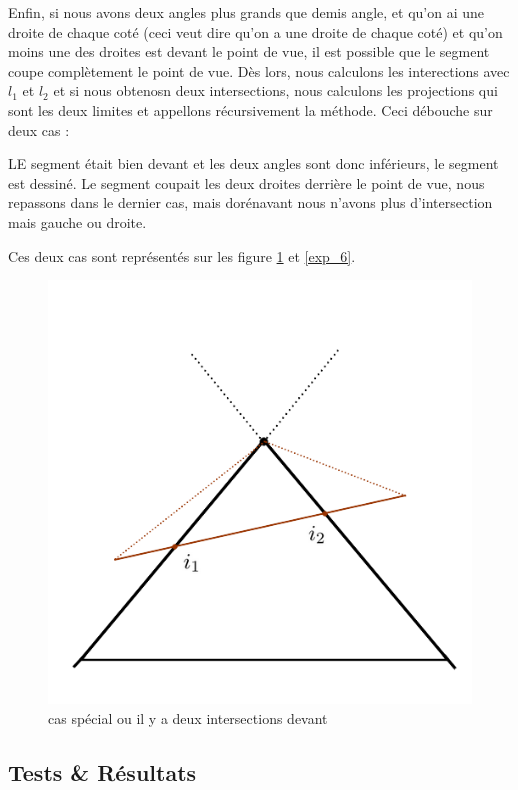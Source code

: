 \documentclass[11pt,a4paper]{article}
\begin{document}
Enfin, si nous avons deux angles plus grands que demis angle, et qu'on ai une droite de chaque coté (ceci veut dire qu'on a une droite de chaque coté) et qu'on moins une des droites est devant le point de vue, il est possible que le segment coupe complètement le point de vue. Dès lors, nous calculons les interections avec $l_1$ et $l_2$ et si nous obtenosn deux intersections, nous calculons les projections qui sont les deux limites et appellons récursivement la méthode. Ceci débouche sur deux cas :

LE segment était bien devant et les deux angles sont donc inférieurs, le segment est dessiné.
Le segment coupait les deux droites derrière le point de vue, nous repassons dans le dernier cas, mais dorénavant nous n'avons plus d'intersection mais gauche ou droite.

Ces deux cas sont représentés sur les figure \ref{exp_5} et \ref{exp_6}.
\begin{figure}[!h]
\centering
\includegraphics[scale=0.5]{casSpecial2.png}
\caption{cas spécial ou il y a deux intersections devant}
\label{exp_5}
\end{figure}
\subsection{Tests \& Résultats}
\end{document}
